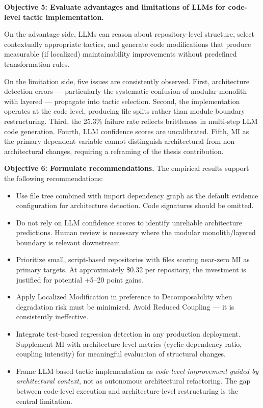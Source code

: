 \textbf{Objective 5: Evaluate advantages and limitations of LLMs for code-level tactic implementation.}

On the advantage side, LLMs can reason about repository-level structure, select contextually appropriate tactics, and generate code modifications that produce measurable (if localized) maintainability improvements without predefined transformation rules.

On the limitation side, five issues are consistently observed. First, architecture detection errors — particularly the systematic confusion of modular monolith with layered — propagate into tactic selection. Second, the implementation operates at the code level, producing file splits rather than module boundary restructuring. Third, the 25.3\% failure rate reflects brittleness in multi-step LLM code generation. Fourth, LLM confidence scores are uncalibrated. Fifth, MI as the primary dependent variable cannot distinguish architectural from non-architectural changes, requiring a reframing of the thesis contribution.

\textbf{Objective 6: Formulate recommendations.}
The empirical results support the following recommendations:

\begin{itemize}
    \item Use file tree combined with import dependency graph as the default evidence configuration for architecture detection. Code signatures should be omitted.
    \item Do not rely on LLM confidence scores to identify unreliable architecture predictions. Human review is necessary where the modular monolith/layered boundary is relevant downstream.
    \item Prioritize small, script-based repositories with files scoring near-zero MI as primary targets. At approximately \$0.32 per repository, the investment is justified for potential +5--20 point gains.
    \item Apply Localized Modification in preference to Decomposability when degradation risk must be minimized. Avoid Reduced Coupling — it is consistently ineffective.
    \item Integrate test-based regression detection in any production deployment. Supplement MI with architecture-level metrics (cyclic dependency ratio, coupling intensity) for meaningful evaluation of structural changes.
    \item Frame LLM-based tactic implementation as \textit{code-level improvement guided by architectural context}, not as autonomous architectural refactoring. The gap between code-level execution and architecture-level restructuring is the central limitation.
\end{itemize}

